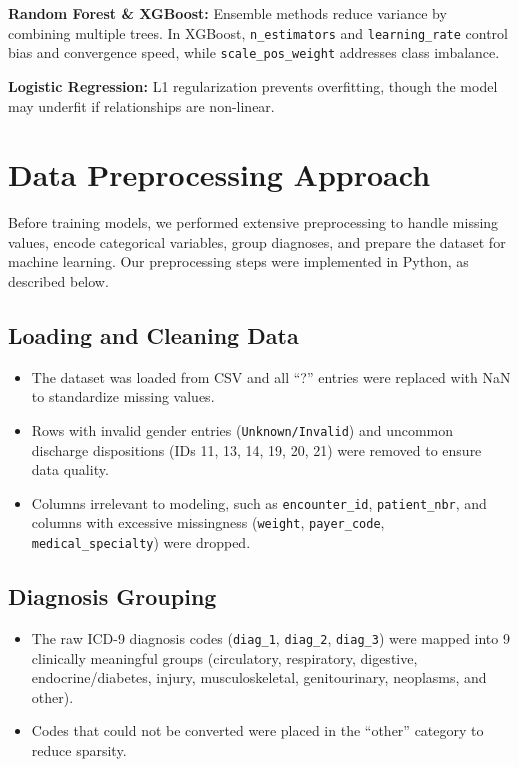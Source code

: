 \documentclass[11pt]{article}
\begin{document}
\textbf{Random Forest \& XGBoost:}  
Ensemble methods reduce variance by combining multiple trees. In XGBoost, \texttt{n\_estimators} and \texttt{learning\_rate} control bias and convergence speed, while \texttt{scale\_pos\_weight} addresses class imbalance.

\textbf{Logistic Regression:}  
L1 regularization prevents overfitting, though the model may underfit if relationships are non-linear.
\section{Data Preprocessing Approach}

Before training models, we performed extensive preprocessing to handle missing values, encode categorical variables, group diagnoses, and prepare the dataset for machine learning. Our preprocessing steps were implemented in Python, as described below.

\subsection{Loading and Cleaning Data}
\begin{itemize}
    \item The dataset was loaded from CSV and all ``?'' entries were replaced with NaN to standardize missing values.
    \item Rows with invalid gender entries (\texttt{Unknown/Invalid}) and uncommon discharge dispositions (IDs 11, 13, 14, 19, 20, 21) were removed to ensure data quality.
    \item Columns irrelevant to modeling, such as \texttt{encounter\_id}, \texttt{patient\_nbr}, and columns with excessive missingness (\texttt{weight}, \texttt{payer\_code}, \texttt{medical\_specialty}) were dropped.
\end{itemize}

\subsection{Diagnosis Grouping}
\begin{itemize}
    \item The raw ICD-9 diagnosis codes (\texttt{diag\_1}, \texttt{diag\_2}, \texttt{diag\_3}) were mapped into 9 clinically meaningful groups (circulatory, respiratory, digestive, endocrine/diabetes, injury, musculoskeletal, genitourinary, neoplasms, and other). 
    \item Codes that could not be converted were placed in the ``other'' category to reduce sparsity.
\end{itemize}
\end{document}
